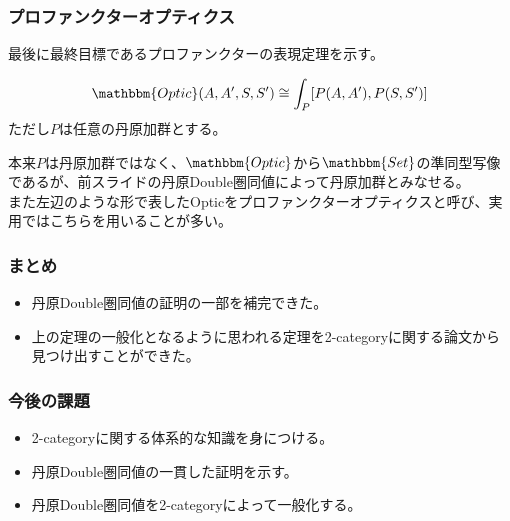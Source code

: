 \documentclass[uplatex,dvipdfmx]{beamer}
\newcommand{\cat}[1]{\mathbbm{#1}}
\newcommand{\inset}[2]{[#1,#2]}
\begin{document}
  \begin{frame}\frametitle{プロファンクターオプティクス}
    最後に最終目標であるプロファンクターの表現定理を示す。
    \begin{theorem}[プロファンクターの表現定理]
      \[\cat{Optic}(A,A',S,S') \cong \int_P \inset{P(A,A')}{P(S,S')}\]
      ただし$P$は任意の丹原加群とする。
    \end{theorem}
    \vspace{\baselineskip}

    本来$P$は丹原加群ではなく、$\cat{Optic}$から$\cat{Set}$の準同型写像であるが、前スライドの丹原Double圏同値によって丹原加群とみなせる。\\
    \vspace{\baselineskip}
    また左辺のような形で表したOpticをプロファンクターオプティクスと呼び、実用ではこちらを用いることが多い。
  \end{frame}
  \begin{frame}
    \frametitle{まとめ}
    \begin{itemize}
      \item 丹原Double圏同値の証明の一部を補完できた。\\
      \vspace{\baselineskip}
      \item 上の定理の一般化となるように思われる定理を2-categoryに関する論文から見つけ出すことができた。
    \end{itemize}
  \end{frame}
  \begin{frame}\frametitle{今後の課題}
    \begin{itemize}
      \item 2-categoryに関する体系的な知識を身につける。\\
      \vspace{\baselineskip}

      \item 丹原Double圏同値の一貫した証明を示す。\\
      \vspace{\baselineskip}

      \item 丹原Double圏同値を2-categoryによって一般化する。
    \end{itemize}
  \end{frame}
\end{document}
